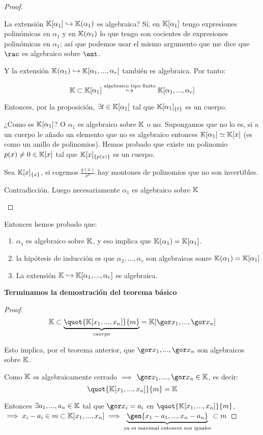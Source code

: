 \begin{proof}
\begin{enumerate}
		La extensión $\mathbb{K}[\alpha_1] \hookrightarrow \mathbb{K}(\alpha_1)$ es algebraica? Sí, en $\mathbb{K}[\alpha_1]$ tengo expresiones polinómicas en $\alpha_1$ y en $\mathbb{K}(\alpha_1)$ lo que tengo son cocientes de expresiones polinómicas en $\alpha_1$;  así que podemos usar el mismo argumento que me dice que $\rac$ es algebraico sobre $\ent$.
		
		Y la extensión $\mathbb{K}(\alpha_1) \hookrightarrow \mathbb{K}[\alpha_1,...,\alpha_r]$ también es algebraica. Por tanto:

		$$ \mathbb{K} \subset \mathbb{K}[\alpha_1] \stackrel{\text{algebraico tipo finito}}{\hookrightarrow} \mathbb{K}[\alpha_1,...,\alpha_r]$$

		Entonces, por la proposición, $\exists t \in \mathbb{K}[\alpha_1]$ tal que $\mathbb{K}[\alpha_1]_{\{t\}}$ es un cuerpo.

		¿Como es $\mathbb{K}[\alpha_1]$? O $\alpha_1$ es algebraico sobre $\mathbb{K}$ o no. Supongamos que no lo es, si a un cuerpo le añado un elemento que no es algebraico entonces $\mathbb{K}[\alpha_1] \simeq \mathbb{K}[x]$ (es como un anillo de polinomios). Hemos probado que existe un polinomio $p(x)\neq 0 \in \mathbb{K}[x]$ tal que $\mathbb{K}[x]_{\{p(x)\}}$ es un cuerpo.

		\begin{example}
			Sea $\mathbb{K}[x]_{\{x\}}$, si cogemos $\frac{q(x)}{x^n}$ hay montones de polinomios que no son invertibles.
		\end{example}

		Contradicción. Luego necesariamente $\alpha_1$ es algebraico sobre $\mathbb{K}$
	\end{enumerate}
\end{proof}

Entonces hemos probado que:
\begin{enumerate}
	\item $\alpha_1$ es algebraico sobre $\mathbb{K}$, y eso implica que $\mathbb{K}(\alpha_1)=\mathbb{K}[\alpha_1]$.
	\item la hipótesis de inducción es que $\alpha_2,...,\alpha_r$ son algebraicos sonre $\mathbb{K}(\alpha_1)=\mathbb{K}[\alpha_1]$ 
	\item La extensión $ \mathbb{K}  \hookrightarrow \mathbb{K}[\alpha_1,...,\alpha_r]$ es algebraica.
\end{enumerate}
 


\textbf{Terminamos la demostración del teorema básico}
\begin{proof}
 $$ \K \subset \underbrace{\quot{\K[x_1,...,x_n]}{m}}_{cuerpo} = \K[\cls{x_1},...,\cls{x_n}]$$

 Esto implica, por el teorema anterior, que $\cls{x_1},...,\cls{x_n}$ son algebraicos sobre $\mathbb{K}$.

 Como $\mathbb{K}$ es algebraicamente cerrado $\implies$ $\cls{x_1},...,\cls{x_n} \in \K$, es decir:
 $$ \quot{\K[x_1,...,x_n]}{m}= \K $$

 Entonces $\exists a_1,...,a_n \in \mathbb{K}$ tal que $\cls{x_i}=a_i$ en $\quot{\K[x_1,...,x_n]}{m}$, $\implies x_i-a_i \in m\subset \K[x_1,...,x_n] \implies \underbrace{\gen{x_1-a_1,...,x_n-a_n}}_{\text{ya es maximal entonces son iguales}} \subset m$
\end{proof}

